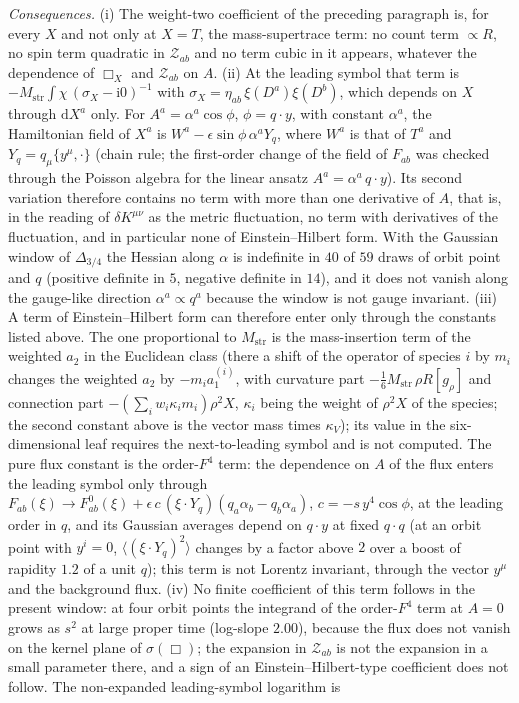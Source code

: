 \emph{Consequences.} (i) The weight-two coefficient of the preceding paragraph is, for every \(X\) and not only at \(X=T\), the mass-supertrace term: no count term \(\propto R\), no spin term quadratic in \(\mathcal Z_{ab}\) and no term cubic in it appears, whatever the dependence of \(\Box_X\) and \(\mathcal Z_{ab}\) on \(A\). (ii) At the leading symbol that term is \(-M_{\mathrm{str}}\int\chi\,(\sigma_X-\mathrm i0)^{-1}\) with \(\sigma_X=\eta_{ab}\,\xi(D^a)\xi(D^b)\), which depends on \(X\) through \(\mathrm dX^a\) only. For \(A^a=\alpha^a\cos\phi\), \(\phi=q\cdot y\), with constant \(\alpha^a\), the Hamiltonian field of \(X^a\) is \(W^a-\epsilon\sin\phi\,\alpha^aY_q\), where \(W^a\) is that of \(T^a\) and \(Y_q=q_\mu\{y^\mu,\cdot\}\) (chain rule; the first-order change of the field of \(F_{ab}\) was checked through the Poisson algebra for the linear ansatz \(A^a=\alpha^a\,q\cdot y\)). Its second variation therefore contains no term with more than one derivative of \(A\), that is, in the reading of \(\delta K^{\mu\nu}\) as the metric fluctuation, no term with derivatives of the fluctuation, and in particular none of Einstein--Hilbert form. With the Gaussian window of \(\Delta_{3/4}\) the Hessian along \(\alpha\) is indefinite in \(40\) of \(59\) draws of orbit point and \(q\) (positive definite in \(5\), negative definite in \(14\)), and it does not vanish along the gauge-like direction \(\alpha^a\propto q^a\) because the window is not gauge invariant. (iii) A term of Einstein--Hilbert form can therefore enter only through the constants listed above. The one proportional to \(M_{\mathrm{str}}\) is the mass-insertion term of the weighted \(a_2\) in the Euclidean class (there a shift of the operator of species \(i\) by \(m_i\) changes the weighted \(a_2\) by \(-m_ia_1^{(i)}\), with curvature part \(-\tfrac16M_{\mathrm{str}}\,\rho R[g_\rho]\) and connection part \(-(\sum_iw_i\kappa_im_i)\rho^2X\), \(\kappa_i\) being the weight of \(\rho^2X\) of the species; the second constant above is the vector mass times \(\kappa_V\)); its value in the six-dimensional leaf requires the next-to-leading symbol and is not computed. The pure flux constant is the order-\(F^4\) term: the dependence on \(A\) of the flux enters the leading symbol only through \(F_{ab}(\xi)\to F^0_{ab}(\xi)+\epsilon\,c\,(\xi\cdot Y_q)(q_a\alpha_b-q_b\alpha_a)\), \(c=-s\,y^4\cos\phi\), at the leading order in \(q\), and its Gaussian averages depend on \(q\cdot y\) at fixed \(q\cdot q\) (at an orbit point with \(y^i=0\), \(\langle(\xi\cdot Y_q)^2\rangle\) changes by a factor above \(2\) over a boost of rapidity \(1.2\) of a unit \(q\)); this term is not Lorentz invariant, through the vector \(y^\mu\) and the background flux. (iv) No finite coefficient of this term follows in the present window: at four orbit points the integrand of the order-\(F^4\) term at \(A=0\) grows as \(s^2\) at large proper time (log-slope \(2.00\)), because the flux does not vanish on the kernel plane of \(\sigma(\Box)\); the expansion in \(\mathcal Z_{ab}\) is not the expansion in a small parameter there, and a sign of an Einstein--Hilbert-type coefficient does not follow. The non-expanded leading-symbol logarithm is 